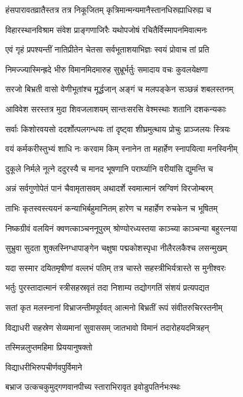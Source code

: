 \twolineshloka
{हंसपारावतव्रातैस्तत्र तत्र निकूजितम्}
{कृत्रिमान्मन्यमानैस्तानधिरुह्याधिरुह्य च}%

\twolineshloka
{विहारस्थानविश्राम संवेश प्राङ्गणाजिरैः}
{यथोपजोषं रचितैर्विस्मापनमिवात्मनः}%

\twolineshloka
{एवं गृहं प्रपश्यन्तीं नातिप्रीतेन चेतसा}
{सर्वभूताशयाभिज्ञः स्वयं प्रोवाच तां प्रति}%

\twolineshloka
{निमज्ज्यास्मिन्ह्रदे भीरु विमानमिदमारुह}
{सुभ्रूर्भर्तुः समादाय वचः कुवलयेक्षणा}%

\twolineshloka
{सरजो बिभ्रती वासो वेणीभूतांश्च मूर्द्धजान्}
{अङ्गं च मलपङ्केन सञ्छन्नं शबलस्तनम्}%

\twolineshloka
{आविवेश सरस्तत्र मुदा शिवजलाशयम्}
{सान्तःसरसि वेश्मस्थाः शतानि दशकन्यकाः}%

\twolineshloka
{सर्वाः किशोरवयसो ददर्शोत्पलगन्धयः}
{तां दृष्ट्वा शीघ्रमुत्थाय प्रोचुः प्राञ्जलयः स्त्रियः}%

\twolineshloka
{वयं कर्मकरीस्तुभ्यं शाधि नः करवाम किम्}
{स्नानेन ता महार्हेण स्नापयित्वा मनस्विनीम्}%

\twolineshloka
{दुकूले निर्मले नूत्ने ददुरस्यै च मानद}
{भूषणानि परार्घ्यानि वरीयांसि द्युमन्ति च}%

\twolineshloka
{अन्नं सर्वगुणोपेतं पानं चैवामृतासवम्}
{अथादर्शे स्वमात्मानं स्रग्विणं विरजोम्बरम्}%

\twolineshloka
{ताभिः कृतस्वस्त्ययनं कन्याभिर्बहुमानितम्}
{हारेण च महार्हेण रुचकेन च भूषितम्}%

\twolineshloka
{निष्कग्रीवं वलयिनं क्वणत्काञ्चननूपुरम्}
{श्रोण्योरध्यस्तया काञ्च्या काञ्चन्या बहुरत्नया}%

\twolineshloka
{सुभ्रुवा सुदता शुक्लस्निग्धापाङ्गेन चक्षुषा}
{पद्मकोशस्पृधा नीलैरलकैश्च लसन्मुखम्}%

\twolineshloka
{यदा सस्मार दयितमृषीणां वल्लभं पतिम्}
{तत्र चास्ते सहस्त्रीभिर्यत्रास्ते स मुनीश्वरः}%

\twolineshloka
{भर्तुः पुरस्तादात्मानं स्त्रीसहस्रवृतं तदा}
{निशाम्य तद्योगगतिं संशयं प्रत्यपद्यत}%

\twolineshloka
{सतां कृत मलस्नानां विभ्राजन्तीमपूर्ववत्}
{आत्मनो बिभ्रतीं रूपं संवीतरुचिरस्तनीम्}%

\twolineshloka
{विद्याधरी सहस्रेण सेव्यमानां सुवाससम्}
{जातभावो विमानं तदारोहयदमित्रहन्}%

तस्मिन्नलुप्तमहिमा प्रिययानुषक्तो

विद्याधरीभिरुपचीर्णवपुर्विमाने

\twolineshloka
{बभ्राज उत्कचकुमुद्गणवानपीच्य}
{स्ताराभिरावृत इवोडुपतिर्नभःस्थः}%

